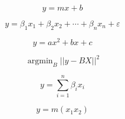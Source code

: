 \documentclass{article}
\newcommand{\argmin}{\mathop{\mathrm{argmin}}}
\begin{document}
$$y = mx + b$$

$$y = \beta_1 x_1 + \beta_2 x_2 + \cdots + \beta_n x_n + \varepsilon$$

$$y = ax^2 + bx + c$$

$$\argmin_{B} ||y - BX||^2$$ 

$$y = \sum\limits_{i=1}^n \beta_i x_i$$

$$y = m(x_1x_2)$$
\end{document}
